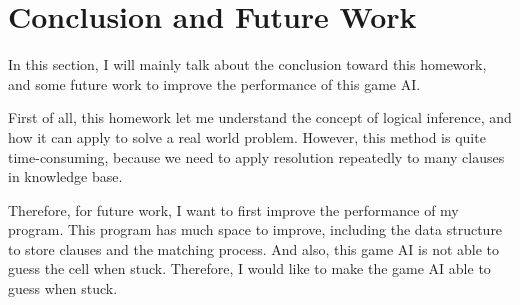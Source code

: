 \documentclass[twocolumn]{extarticle}
\begin{document}
\begin{table}[H]
\centering
\caption{The performance with different number of init safe cell. The parwise matching is the average number of running pairwise matching.}
\label{tab:safe}
\end{table}

\section{Conclusion and Future Work}

In this section, I will mainly talk about the conclusion toward this homework, and some future work to improve the performance of this game AI.

First of all, this homework let me understand the concept of logical inference, and how it can apply to solve a real world problem. However, this method is quite time-consuming, because we need to apply resolution repeatedly to many clauses in knowledge base.

Therefore, for future work, I want to first improve the performance of my program. This program has much space to improve, including the data structure to store clauses and the matching process. And also, this game AI is not able to guess the cell when stuck. Therefore, I would like to make the game AI able to guess when stuck.
\end{document}
